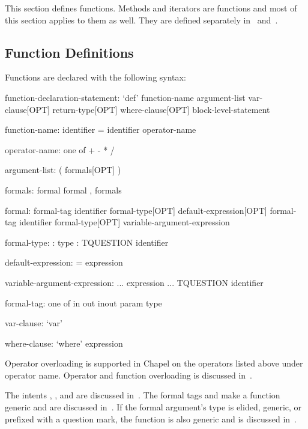 \label{Functions}

This section defines functions.  Methods and iterators are functions
and most of this section applies to them as well.  They are defined
separately in~ and~.

\subsection{Function Definitions}
\label{Function_Definitions}

Functions are declared with the following syntax:
\begin{syntax}
function-declaration-statement:
  `def' function-name argument-list var-clause[OPT]
    return-type[OPT] where-clause[OPT] block-level-statement

function-name:
  identifier
  = identifier
  operator-name

operator-name: one of
  + - * / %

argument-list:
  ( formals[OPT] )

formals:
  formal
  formal , formals

formal:
  formal-tag identifier formal-type[OPT] default-expression[OPT]
  formal-tag identifier formal-type[OPT] variable-argument-expression

formal-type:
  : type
  : TQUESTION identifier

default-expression:
  = expression

variable-argument-expression:
  ... expression
  ... TQUESTION identifier

formal-tag: one of
  in out inout param type

var-clause:
  `var'

where-clause:
  `where' expression
\end{syntax}

Operator overloading is supported in Chapel on the operators listed
above under operator name.  Operator and function overloading is
discussed in~.

The intents , , and  are discussed
in~.  The formal tags  and  make
a function generic and are discussed in~.  If the
formal argument's type is elided, generic, or prefixed with a question
mark, the function is also generic and is discussed
in~.

